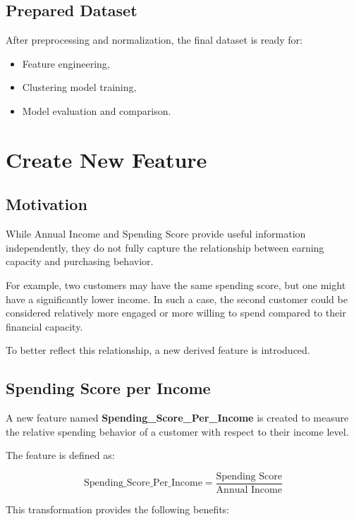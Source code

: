 \documentclass[12pt,a4paper]{article}
\begin{document}
\subsection{Prepared Dataset}

After preprocessing and normalization, the final dataset is ready for:

\begin{itemize}
    \item Feature engineering,
    \item Clustering model training,
    \item Model evaluation and comparison.
\end{itemize}


\section{Create New Feature}

\subsection{Motivation}

While Annual Income and Spending Score provide useful information independently, they do not fully capture the relationship between earning capacity and purchasing behavior.

For example, two customers may have the same spending score, but one might have a significantly lower income. In such a case, the second customer could be considered relatively more engaged or more willing to spend compared to their financial capacity.

To better reflect this relationship, a new derived feature is introduced.

\subsection{Spending Score per Income}

A new feature named \textbf{Spending\_Score\_Per\_Income} is created to measure the relative spending behavior of a customer with respect to their income level.

The feature is defined as:

\[
\text{Spending\_Score\_Per\_Income} = \frac{\text{Spending Score}}{\text{Annual Income}}
\]

This transformation provides the following benefits:
\end{document}
